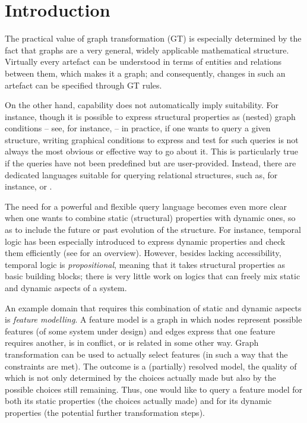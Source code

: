
\section{Introduction}

The practical value of graph transformation (GT) is especially determined by the
fact that graphs are a very general, widely applicable mathematical structure.
Virtually every artefact can be understood in terms of entities and relations
between them, which makes it a graph; and consequently, changes in such an
artefact can be specified through GT rules.

On the other hand, capability does not automatically imply suitability. For
instance, though it is possible to express structural properties as (nested)
graph conditions -- see, for instance, \cite{Rensink2004,HabelPenRen2006} -- in
practice, if one wants to query a given structure, writing graphical conditions
to express and test for such queries is not always the most obvious or effective
way to go about it. This is particularly true if the queries have not been
predefined but are user-provided.  Instead, there are dedicated languages
suitable for querying relational structures, such as, for instance, \SQL or
\PROLOG.

The need for a powerful and flexible query language becomes even more clear
when one wants to combine static (structural) properties with dynamic ones, so
as to include the future or past evolution of the structure. For instance,
temporal logic has been especially introduced to express dynamic properties and
check them efficiently (see \cite{BaierKat2008} for an overview). However,
besides lacking accessibility, temporal logic is \emph{propositional}, meaning
that it takes structural properties as basic building blocks; there is very
little work on logics that can freely mix static and dynamic aspects of a
system.

\medskip\noindent An example domain that requires this combination of static
and dynamic aspects is \emph{feature modelling}. A feature model is a graph in which
nodes represent possible features (of some system under design) and edges express
that one feature requires another, is in conflict, or is related in some
other way. Graph transformation can be used to actually select features (in
such a way that the constraints are met). The outcome is a (partially) resolved
model, the quality of which is not only determined by the choices actually made
but also by the possible choices still remaining. Thus, one would like to query
a feature model for both its static properties (the choices actually made)
and for its dynamic properties (the potential further transformation steps).
 
